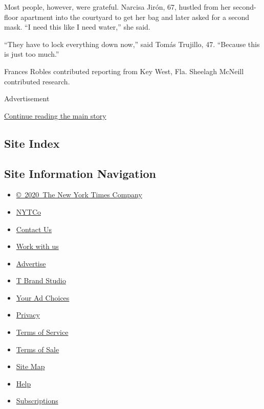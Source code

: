 Most people, however, were grateful. Narcisa Jirón, 67, hustled from her
second-floor apartment into the courtyard to get her bag and later asked
for a second mask. ``I need this like I need water,'' she said.

``They have to lock everything down now,'' said Tomás Trujillo, 47.
``Because this is just too much.''

Frances Robles contributed reporting from Key West, Fla. Sheelagh
McNeill contributed research.

Advertisement

\protect\hyperlink{after-bottom}{Continue reading the main story}

\hypertarget{site-index}{%
\subsection{Site Index}\label{site-index}}

\hypertarget{site-information-navigation}{%
\subsection{Site Information
Navigation}\label{site-information-navigation}}

\begin{itemize}
\tightlist
\item
  \href{https://help.nytimes3xbfgragh.onion/hc/en-us/articles/115014792127-Copyright-notice}{©~2020~The
  New York Times Company}
\end{itemize}

\begin{itemize}
\tightlist
\item
  \href{https://www.nytco.com/}{NYTCo}
\item
  \href{https://help.nytimes3xbfgragh.onion/hc/en-us/articles/115015385887-Contact-Us}{Contact
  Us}
\item
  \href{https://www.nytco.com/careers/}{Work with us}
\item
  \href{https://nytmediakit.com/}{Advertise}
\item
  \href{http://www.tbrandstudio.com/}{T Brand Studio}
\item
  \href{https://www.nytimes3xbfgragh.onion/privacy/cookie-policy\#how-do-i-manage-trackers}{Your
  Ad Choices}
\item
  \href{https://www.nytimes3xbfgragh.onion/privacy}{Privacy}
\item
  \href{https://help.nytimes3xbfgragh.onion/hc/en-us/articles/115014893428-Terms-of-service}{Terms
  of Service}
\item
  \href{https://help.nytimes3xbfgragh.onion/hc/en-us/articles/115014893968-Terms-of-sale}{Terms
  of Sale}
\item
  \href{https://spiderbites.nytimes3xbfgragh.onion}{Site Map}
\item
  \href{https://help.nytimes3xbfgragh.onion/hc/en-us}{Help}
\item
  \href{https://www.nytimes3xbfgragh.onion/subscription?campaignId=37WXW}{Subscriptions}
\end{itemize}
